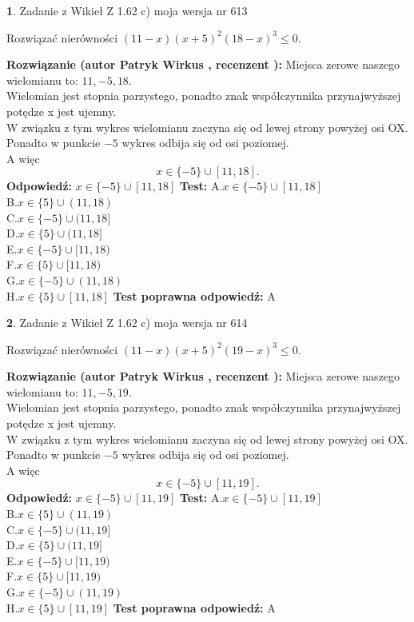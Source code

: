 \documentclass[12pt, a4paper]{article}
\theoremstyle{definition} %
\newtheorem{zad}{}
\newcommand{\zadStart}[1]{\begin{zad}#1\newline}
\newcommand{\zadStop}{\end{zad}}
\newcommand{\rozwStart}[2]{\noindent \textbf{Rozwiązanie (autor #1 , recenzent #2): }\newline}
\newcommand{\rozwStop}{\newline}
\newcommand{\odpStart}{\noindent \textbf{Odpowiedź:}\newline}
\newcommand{\odpStop}{\newline}
\newcommand{\testStart}{\noindent \textbf{Test:}\newline}
\newcommand{\testStop}{\newline}
\newcommand{\kluczStart}{\noindent \textbf{Test poprawna odpowiedź:}\newline}
\newcommand{\kluczStop}{\newline}
\begin{document}
\zadStart{Zadanie z Wikieł Z 1.62 c) moja wersja nr 613}

Rozwiązać nierówności $(11-x)(x+5)^{2}(18-x)^{3}\le0$.
\zadStop
\rozwStart{Patryk Wirkus}{}
Miejsca zerowe naszego wielomianu to: $11, -5, 18$.\\
Wielomian jest stopnia parzystego, ponadto znak współczynnika przy\linebreak najwyższej potędze x jest ujemny.\\ W związku z tym wykres wielomianu zaczyna się od lewej strony powyżej osi OX.\\
Ponadto w punkcie $-5$ wykres odbija się od osi poziomej.\\
A więc $$x \in \{-5\} \cup [11,18].$$
\rozwStop
\odpStart
$x \in \{-5\} \cup [11,18]$
\odpStop
\testStart
A.$x \in \{-5\} \cup [11,18]$\\
B.$x \in \{5\} \cup (11,18)$\\
C.$x \in \{-5\} \cup (11,18]$\\
D.$x \in \{5\} \cup (11,18]$\\
E.$x \in \{-5\} \cup [11,18)$\\
F.$x \in \{5\} \cup [11,18)$\\
G.$x \in \{-5\} \cup (11,18)$\\
H.$x \in \{5\} \cup [11,18]$
\testStop
\kluczStart
A
\kluczStop



\zadStart{Zadanie z Wikieł Z 1.62 c) moja wersja nr 614}

Rozwiązać nierówności $(11-x)(x+5)^{2}(19-x)^{3}\le0$.
\zadStop
\rozwStart{Patryk Wirkus}{}
Miejsca zerowe naszego wielomianu to: $11, -5, 19$.\\
Wielomian jest stopnia parzystego, ponadto znak współczynnika przy\linebreak najwyższej potędze x jest ujemny.\\ W związku z tym wykres wielomianu zaczyna się od lewej strony powyżej osi OX.\\
Ponadto w punkcie $-5$ wykres odbija się od osi poziomej.\\
A więc $$x \in \{-5\} \cup [11,19].$$
\rozwStop
\odpStart
$x \in \{-5\} \cup [11,19]$
\odpStop
\testStart
A.$x \in \{-5\} \cup [11,19]$\\
B.$x \in \{5\} \cup (11,19)$\\
C.$x \in \{-5\} \cup (11,19]$\\
D.$x \in \{5\} \cup (11,19]$\\
E.$x \in \{-5\} \cup [11,19)$\\
F.$x \in \{5\} \cup [11,19)$\\
G.$x \in \{-5\} \cup (11,19)$\\
H.$x \in \{5\} \cup [11,19]$
\testStop
\kluczStart
A
\kluczStop
\end{document}

